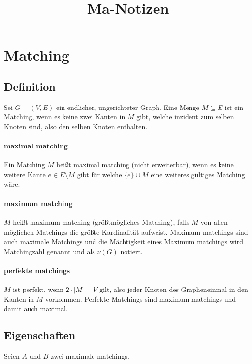 \documentclass[paper=a4,10pt]{scrartcl}
\begin{document}
\title{Ma-Notizen}

\section{Matching}
\subsection{Definition}
Sei $G=(V,E)$ ein endlicher, ungerichteter Graph. Eine Menge $M\subseteq E$ ist ein Matching, wenn es keine zwei Kanten in $M$ gibt, welche inzident zum selben Knoten sind, also den selben Knoten enthalten.

\paragraph{maximal matching}
Ein Matching $M$ heißt maximal matching (nicht erweiterbar), wenn es keine weitere Kante $e \in E \setminus M$ gibt für welche $\{ e\} \cup M$ eine weiteres gültiges Matching wäre.

\paragraph{maximum matching}
$M$ heißt maximum matching (größtmögliches Matching), falls $M$ von allen möglichen Matchings die größte Kardinalität aufweist. Maximum matchings sind auch maximale Matchings und die Mächtigkeit eines Maximum matchings wird Matchingzahl genannt und als $\nu(G)$ notiert.

\paragraph{perfekte matchings}
$M$ ist perfekt, wenn $2 \cdot |M| = V$ gilt, also jeder Knoten des Grapheneinmal in den Kanten in $M$ vorkommen. Perfekte Matchings sind maximum matchings und damit auch maximal. 

\subsection{Eigenschaften}
Seien $A$ und $B$ zwei maximale matchings. 
\end{document}
